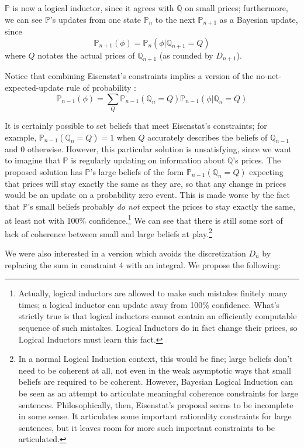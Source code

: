 \documentclass{article}
\begin{document}
$\mathbb{P}$ is now a logical inductor, since it agrees with $\mathbb{Q}$ on small prices; furthermore, we can see $\mathbb{P}$'s updates from one state $\mathbb{P}_n$ to the next $\mathbb{P}_{n+1}$ as a Bayesian update, since 
\[\mathbb{P}_{n+1}(\phi)=\mathbb{P}_n(\phi|\mathbb{Q}_{n+1}=Q)\]
where $Q$ notates the actual prices of $\mathbb{Q}_{n+1}$ (as rounded by $D_{n+1}$).

Notice that combining Eisenstat's constraints implies a version of the no-net-expected-update rule of probability \cite{garrabrant2016logical}:
\[\mathbb{P}_{n-1}(\phi)=\sum_Q \mathbb{P}_{n-1}(\mathbb{Q}_n=Q)\mathbb{P}_{n-1}(\phi|\mathbb{Q}_n=Q)\]

It is certainly possible to set beliefs that meet Eisenstat's constraints; for example, $\mathbb{P}_{n-1}(\mathbb{Q}_n=Q)=1$ when $Q$ accurately describes the beliefs of $\mathbb{Q}_{n-1}$ and $0$ otherwise. However, this particular solution is unsatisfying, since we want to imagine that $\mathbb{P}$ is regularly updating on information about $\mathbb{Q}$'s prices. The proposed solution has $\mathbb{P}$'s large beliefs of the form $\mathbb{P}_{n-1}(\mathbb{Q}_n=Q)$ expecting that prices will stay exactly the same as they are, so that any change in prices would be an update on a probability zero event. This is made worse by the fact that $\mathbb{P}$'s small beliefs probably \textit{do not} expect the prices to stay exactly the same, at least not with 100\% confidence.\footnote{Actually, logical inductors are allowed to make such mistakes finitely many times; a logical inductor can update away from 100\% confidence. What's strictly true is that logical inductors cannot contain an efficiently computable sequence of such mistakes. Logical Inductors do in fact change their prices, so Logical Inductors must learn this fact.} We can see that there is still some sort of lack of coherence between small and large beliefs at play.\footnote{In a normal Logical Induction context, this would be fine; large beliefs don't need to be coherent at all, not even in the weak asymptotic ways that small beliefs are required to be coherent. However, Bayesian Logical Induction can be seen as an attempt to articulate meaningful coherence constraints for large sentences. Philosophically, then, Eisenstat's proposal seems to be incomplete in some sense. It articulates some important rationality constraints for large sentences, but it leaves room for more such important constraints to be articulated.}

We were also interested in a version which avoids the discretization $D_n$ by replacing the sum in constraint 4 with an integral. We propose the following:
\end{document}
